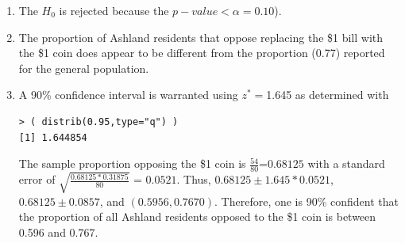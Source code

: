\documentclass[10pt,openany]{book}\usepackage[]{graphicx}\usepackage[]{color}
\makeatletter
\newenvironment{kframe}{%
 \def\at@end@of@kframe{}%
 \ifinner\ifhmode%
  \def\at@end@of@kframe{\end{minipage}}%
  \begin{minipage}{\columnwidth}%
 \fi\fi%
 \def\FrameCommand##1{\hskip\@totalleftmargin \hskip-\fboxsep
 \colorbox{shadecolor}{##1}\hskip-\fboxsep
     \hskip-\linewidth \hskip-\@totalleftmargin \hskip\columnwidth}%
 \MakeFramed {\advance\hsize-\width
   \@totalleftmargin\z@ \linewidth\hsize
   \@setminipage}}%
 {\par\unskip\endMakeFramed%
 \at@end@of@kframe}
\newenvironment{knitrout}{}{} %
\makeatother
\begin{document}
\begin{enumerate}
\begin{knitrout}
\begin{kframe}
{\ttfamily\noindent\bfseries\color{errorcolor}{Error in plot.window(...): need finite 'ylim' values}}\end{kframe}
\end{knitrout}
    \item The $H_{0}$ is rejected because the $p-value <\alpha=0.10$).
    \item The proportion of Ashland residents that oppose replacing the \$1 bill with the \$1 coin does appear to be different from the proportion (0.77) reported for the general population.
    \item A 90\% confidence interval is warranted using $z^{*}=$1.645 as determined with
\begin{knitrout}
\color{fgcolor}\begin{kframe}
\begin{verbatim}
> ( distrib(0.95,type="q") )
[1] 1.644854
\end{verbatim}
\end{kframe}
\end{knitrout}
The sample proportion opposing the \$1 coin is $\frac{54}{80}$=$0.68125$ with a standard error of $\sqrt{\frac{0.68125*0.31875}{80}}$ = $0.0521$.  Thus, $0.68125\pm1.645*0.0521$, $0.68125\pm0.0857$, and $(0.5956,0.7670)$.  Therefore, one is 90\% confident that the proportion of all Ashland residents opposed to the \$1 coin is between 0.596 and 0.767.
\end{enumerate}
\end{document}
